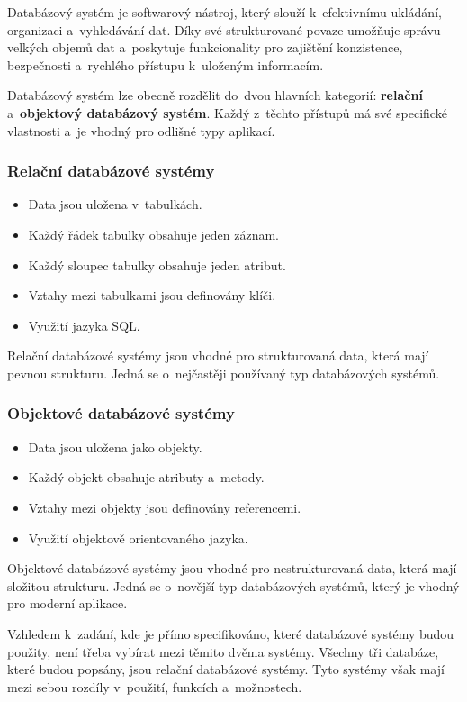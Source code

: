 Databázový systém je softwarový nástroj, který slouží k~efektivnímu ukládání, organizaci a~vyhledávání dat.
Díky své strukturované povaze umožňuje správu velkých objemů dat a~poskytuje funkcionality pro
zajištění konzistence, bezpečnosti a~rychlého přístupu k~uloženým informacím.

Databázový systém lze obecně rozdělit do~dvou hlavních kategorií: \textbf{relační} a~\textbf{objektový databázový systém}.
Každý z~těchto přístupů má své specifické vlastnosti a~je vhodný pro odlišné typy aplikací.

\subsubsection*{Relační databázové systémy}
\begin{itemize}[itemsep=-1pt]
    \item Data jsou uložena v~tabulkách.
    \item Každý řádek tabulky obsahuje jeden záznam.
    \item Každý sloupec tabulky obsahuje jeden atribut.
    \item Vztahy mezi tabulkami jsou definovány klíči.
    \item Využití jazyka SQL.
\end{itemize}
Relační databázové systémy jsou vhodné pro strukturovaná data, která mají pevnou strukturu.
Jedná se o~nejčastěji používaný typ databázových systémů.

\subsubsection*{Objektové databázové systémy}
\begin{itemize}[itemsep=-1pt]
    \item Data jsou uložena jako objekty.
    \item Každý objekt obsahuje atributy a~metody.
    \item Vztahy mezi objekty jsou definovány referencemi.
    \item Využití objektově orientovaného jazyka.
\end{itemize}
Objektové databázové systémy jsou vhodné pro nestrukturovaná data, která mají složitou strukturu.
Jedná se o~novější typ databázových systémů, který je vhodný pro moderní aplikace.

Vzhledem k~zadání, kde je přímo specifikováno, které databázové systémy budou použity,
není třeba vybírat mezi těmito dvěma systémy. Všechny tři databáze, které budou popsány,
jsou relační databázové systémy. Tyto systémy však mají mezi sebou rozdíly v~použití, funkcích a~možnostech.


